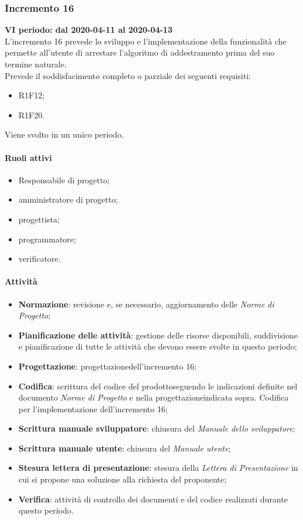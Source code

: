 \subsubsection{Incremento 16}
\textbf{VI periodo: dal 2020-04-11 al 2020-04-13} \\
L'incremento 16 prevede lo sviluppo e l'implementazione della funzionalità che permette all'utente di arrestare l'algoritmo di addestramento prima del suo termine naturale.
\\Prevede il soddisfacimento completo o parziale dei seguenti requisiti:
\begin{itemize}
	\item R1F12;
	\item R1F20.
\end{itemize}
Viene svolto in un unico periodo.
\paragraph{Ruoli attivi}
\begin{itemize}
	\item Responsabile di progetto\glo;
	\item amministratore di progetto\glo;
	\item progettista;
	\item programmatore;
	\item verificatore.
\end{itemize}
\paragraph{Attività} 
\begin{itemize}
	\item \textbf{Normazione}: revisione e, se necessario, aggiornamento delle \textit{Norme di Progetto};
	\item \textbf{Pianificazione delle attività}: gestione delle risorse disponibili, suddivisione e pianificazione di tutte le attività che devono essere svolte in questo periodo;
	\item \textbf{Progettazione}\glo: progettazione\glosp dell'incremento 16;  
	\item \textbf{Codifica}: scrittura del codice del prodotto\glosp seguendo le indicazioni definite nel documento \textit{Norme di Progetto} e nella progettazione\glosp indicata sopra. Codifica per l'implementazione dell'incremento 16;
	\item \textbf{Scrittura manuale sviluppatore}: chiusura del \textit{Manuale dello sviluppatore};
	\item \textbf{Scrittura manuale utente}: chiusura del \textit{Manuale utente};
	\item \textbf{Stesura lettera di presentazione}: stesura della \textit{Lettera di Presentazione} in cui si propone una soluzione alla richiesta del proponente;
	\item \textbf{Verifica}: attività di controllo dei documenti e del codice realizzati durante questo periodo.
\end{itemize}

